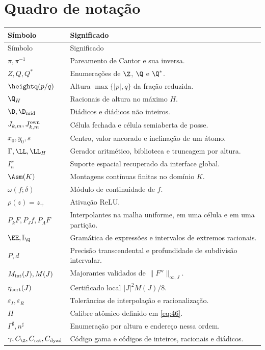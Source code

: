 \section{Quadro de notação}
\footnotesize
\renewcommand{\arraystretch}{1.1}
\begin{longtable}{@{}p{.28\linewidth}p{.68\linewidth}@{}}
\toprule Símbolo&Significado\\\midrule
\endfirsthead
\toprule Símbolo&Significado\\\midrule
\endhead
\bottomrule\endfoot
$\pi,\pi^{-1}$&Pareamento de Cantor e sua inversa.\\
$Z,Q,Q^*$&Enumerações de $\Z$, $\Q$ e $\Q^*$.\\
$\heightq(p/q)$&Altura $\max\{|p|,q\}$ da fração reduzida.\\
$\Q_H$&Racionais de altura no máximo $H$.\\
$\D,\D_{\rm mid}$&Diádicos e diádicos não inteiros.\\
$J_{k,m},J_{k,m}^{\rm own}$&Célula fechada e célula semiaberta de posse.\\
$x_0,y_0,s$&Centro, valor ancorado e inclinação de um átomo.\\
$\Gamma,\LL,\LL_H$&Gerador aritmético, biblioteca e truncagem por altura.\\
$I_n^x$&Suporte espacial recuperado da interface global.\\
$\Asm(K)$&Montagens contínuas finitas no domínio $K$.\\
$\omega(f;\delta)$&Módulo de continuidade de $f$.\\
$\rho(z)=z_+$&Ativação ReLU.\\
$P_kF,P_Jf,P_\Lambda F$&Interpolantes na malha uniforme, em uma célula e em uma partição.\\
$\EE,\mathbb I_{\Q}$&Gramática de expressões e intervalos de extremos racionais.\\
$P,d$&Precisão transcendental e profundidade de subdivisão intervalar.\\
$M_{\rm int}(J),M(J)$&Majorantes validados de $\|F''\|_{\infty,J}$.\\
$\eta_{\rm cert}(J)$&Certificado local $|J|^2M(J)/8$.\\
$\varepsilon_I,\varepsilon_R$&Tolerâncias de interpolação e racionalização.\\
$H$&Calibre atômico definido em \eqref{eq:46}.\\
$\Gamma^\sharp,n^\sharp$&Enumeração por altura e endereço nessa ordem.\\
$\gamma,C_{\Z},C_{\rm rat},C_{\rm dyad}$&Código gama e códigos de inteiros, racionais e diádicos.\\

\end{longtable}
